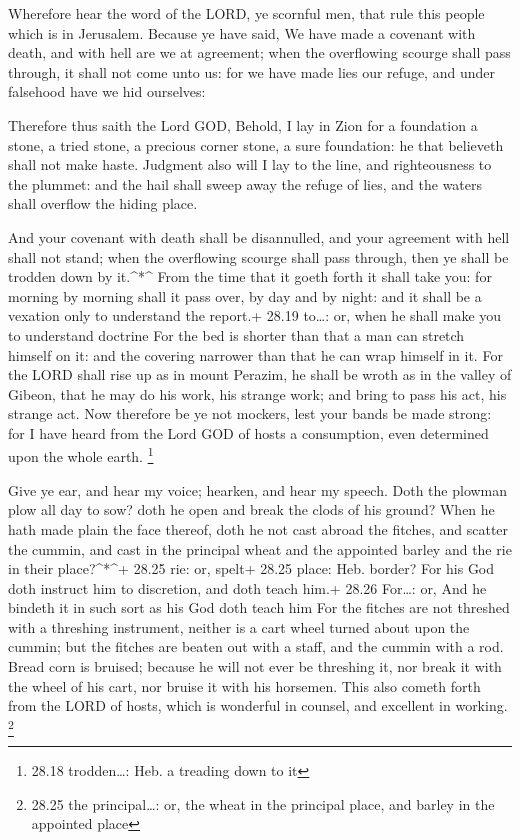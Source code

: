  Wherefore hear the word of the LORD, ye scornful men, that
rule this people which is in Jerusalem.  Because ye have
said, We have made a covenant with death, and with hell are we at
agreement; when the overflowing scourge shall pass through, it shall not
come unto us: for we have made lies our refuge, and under falsehood have
we hid ourselves:

 Therefore thus saith the Lord GOD, Behold, I lay in Zion
for a foundation a stone, a tried stone, a precious corner stone, a sure
foundation: he that believeth shall not make haste. 
Judgment also will I lay to the line, and righteousness to the plummet:
and the hail shall sweep away the refuge of lies, and the waters shall
overflow the hiding place.

 And your covenant with death shall be disannulled, and
your agreement with hell shall not stand; when the overflowing scourge
shall pass through, then ye shall be trodden down by it.\^{}*\^{}
 From the time that it goeth forth it shall take you: for
morning by morning shall it pass over, by day and by night: and it shall
be a vexation only to understand the report.+ 28.19 to\ldots: or, when
he shall make you to understand doctrine  For the bed is
shorter than that a man can stretch himself on it: and the covering
narrower than that he can wrap himself in it.  For the LORD
shall rise up as in mount Perazim, he shall be wroth as in the valley of
Gibeon, that he may do his work, his strange work; and bring to pass his
act, his strange act.  Now therefore be ye not mockers,
lest your bands be made strong: for I have heard from the Lord GOD of
hosts a consumption, even determined upon the whole earth. \footnote{28.18
  trodden\ldots: Heb. a treading down to it}

 Give ye ear, and hear my voice; hearken, and hear my
speech.  Doth the plowman plow all day to sow? doth he open
and break the clods of his ground?  When he hath made plain
the face thereof, doth he not cast abroad the fitches, and scatter the
cummin, and cast in the principal wheat and the appointed barley and the
rie in their place?\^{}*\^{}+ 28.25 rie: or, spelt+ 28.25 place: Heb.
border?  For his God doth instruct him to discretion, and
doth teach him.+ 28.26 For\ldots: or, And he bindeth it in such sort as
his God doth teach him  For the fitches are not threshed
with a threshing instrument, neither is a cart wheel turned about upon
the cummin; but the fitches are beaten out with a staff, and the cummin
with a rod.  Bread corn is bruised; because he will not
ever be threshing it, nor break it with the wheel of his cart, nor
bruise it with his horsemen.  This also cometh forth from
the LORD of hosts, which is wonderful in counsel, and excellent in
working. \footnote{28.25 the principal\ldots: or, the wheat in the
  principal place, and barley in the appointed place}

